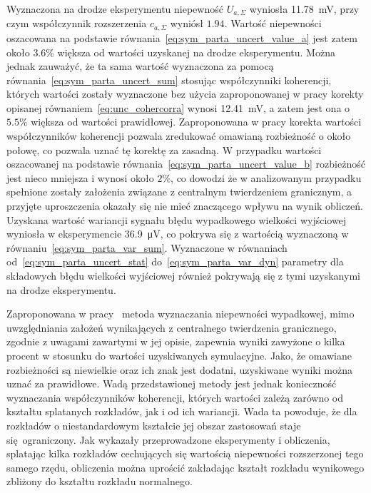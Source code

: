 Wyznaczona na drodze eksperymentu niepewność $U_{a,\Sigma}$ wyniosła \qty{11.78}{mV}, przy czym współczynnik rozszerzenia $c_{a,\Sigma}$ wyniósł $1.94$. Wartość niepewności oszacowana na podstawie równania~\eqref{eq:sym_parta_uncert_value_a} jest zatem około $3.6\%$ większa od wartości uzyskanej na drodze eksperymentu. Można jednak zauważyć, że ta sama wartość wyznaczona za pomocą równania~\eqref{eq:sym_parta_uncert_sum} stosując współczynniki koherencji, których wartości zostały wyznaczone bez użycia zaproponowanej w pracy korekty opisanej równaniem~\eqref{eq:unc_cohercorra} wynosi \qty{12.41}{mV}, a zatem jest ona o $5.5\%$ większa od wartości prawidłowej. Zaproponowana w pracy korekta wartości współczynników koherencji pozwala zredukować omawianą rozbieżność o około połowę, co pozwala uznać tę korektę za zasadną. W przypadku wartości oszacowanej na podstawie równania~\eqref{eq:sym_parta_uncert_value_b} rozbieżność jest nieco mniejsza i wynosi około $2\%$, co dowodzi że w analizowanym przypadku spełnione zostały założenia związane z centralnym twierdzeniem granicznym, a przyjęte uproszczenia okazały się nie mieć znaczącego wpływu na wynik obliczeń. Uzyskana wartość wariancji sygnału błędu wypadkowego wielkości wyjściowej wyniosła w eksperymencie \qty{36.9}{\micro V}, co pokrywa się z wartością wyznaczoną w równaniu~\eqref{eq:sym_parta_var_sum}. Wyznaczone w równaniach od~\eqref{eq:sym_parta_uncert_stat} do~\eqref{eq:sym_parta_var_dyn} parametry dla składowych błędu wielkości wyjściowej również pokrywają się z tymi uzyskanymi na drodze eksperymentu.

Zaproponowana w pracy~\cite{jakubiec_system} metoda wyznaczania niepewności wypadkowej, mimo uwzględniania założeń wynikających z centralnego twierdzenia granicznego, zgodnie z uwagami zawartymi w jej opisie, zapewnia wyniki zawyżone o kilka procent w stosunku do wartości uzyskiwanych symulacyjne. Jako, że omawiane rozbieżności są niewielkie oraz ich znak jest dodatni, uzyskiwane wyniki można uznać za prawidłowe. Wadą przedstawionej metody jest jednak konieczność wyznaczania współczynników koherencji, których wartości zależą zarówno od kształtu splatanych rozkładów, jak i od ich wariancji. Wada ta powoduje, że dla rozkładów o niestandardowym kształcie jej obszar zastosowań staje się ograniczony. Jak wykazały przeprowadzone eksperymenty i obliczenia, splatając kilka rozkładów cechujących się wartością niepewności rozszerzonej tego samego rzędu, obliczenia można uprościć zakładając kształt rozkładu wynikowego zbliżony do kształtu rozkładu normalnego.


